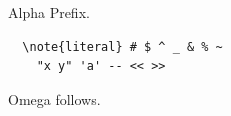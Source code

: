 \documentclass[12pt,aspectratio=43]{beamer}
\begin{document}
\begin{frame}[fragile]{Alpha}
Prefix.
\begin{lstlisting}
  \note{literal} # $ ^ _ & % ~
    "x y" 'a' -- << >>
\end{lstlisting}
Omega follows.
\end{frame}
\end{document}
